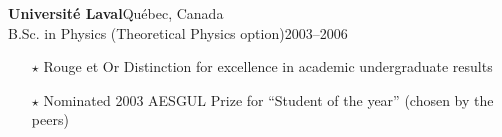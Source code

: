 \documentclass[11pt]{article}
\begin{document}
%
\textbf{Universit\'e Laval}\hfill Qu\'ebec, Canada\\
B.Sc. in Physics (Theoretical Physics option)\hfill 2003--2006
\begin{itemize}[noitemsep, leftmargin=1.5em, topsep=0pt, after=\vspace{1.75\baselineskip}]\small
  \item[$\star$] Rouge et Or Distinction for excellence in academic undergraduate results
  \item[$\star$] Nominated 2003 AESGUL Prize for ``Student of the year'' (chosen by the peers)
\end{itemize}
%
\end{document}
